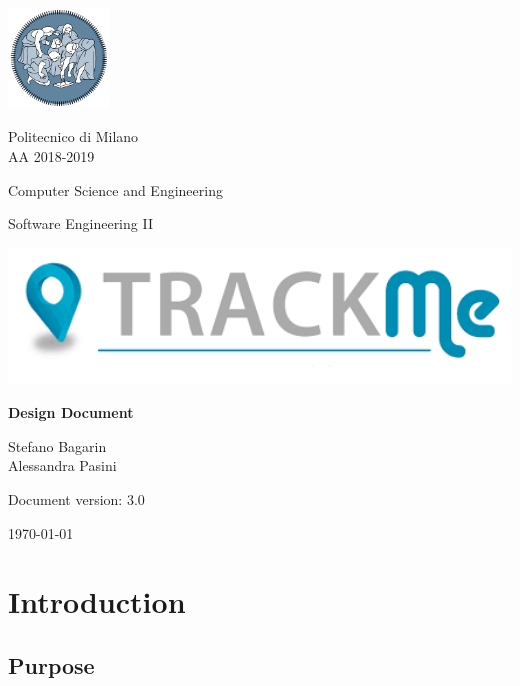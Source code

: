 \documentclass[a4paper,12pt]{report}
\begin{document}
	\begin{titlepage}
		\centering
		\includegraphics[width=0.20\textwidth]{./pictures/logo_polimi.png}\par

		{Politecnico di Milano \\ AA 2018-2019} \par
		\vspace{1.5cm}

		{Computer Science and Engineering}\par
		\Large{Software Engineering II}\par
		\vspace{1.0cm}

		\includegraphics[width=1.00\textwidth]{./pictures/logo_trackme.png}\par
		{\LARGE \textbf{Design Document} \par}
		\vspace{1.0cm}
		{\Large Stefano Bagarin\\ Alessandra Pasini\par}
		\vspace{2cm}
		\vfill

		{\large Document version: 3.0\par}
		{\large \today \par}
	\end{titlepage}

	\tableofcontents

	\chapter{Introduction}
	\label{ch:Introduction}

	\section{Purpose}
	
\end{document}

